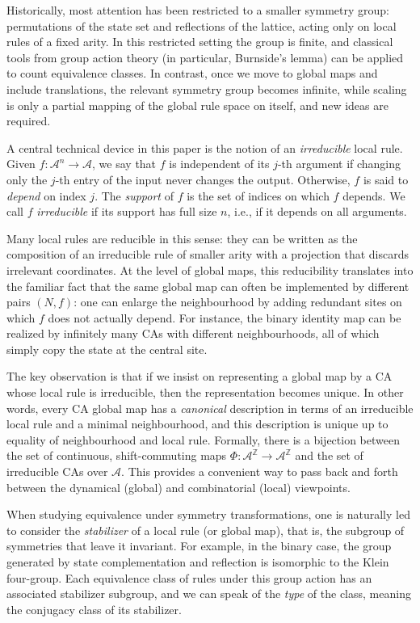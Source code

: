 \documentclass[a4paper]{article}
\begin{document}
Historically, most attention has been restricted to a smaller symmetry group:
permutations of the state set and reflections of the lattice, acting only on local
rules of a fixed arity. In this restricted setting the group is finite, and
classical tools from group action theory (in particular, Burnside's lemma) can
be applied to count equivalence classes. In contrast, once we move to global
maps and include translations, the relevant symmetry group becomes
infinite, while scaling is only a partial mapping of the global rule space on itself,
and new ideas are required.

A central technical device in this paper is the notion of an \emph{irreducible}
local rule. Given $f : \mathcal{A}^{n} \to \mathcal{A}$, we say that $f$ is independent of its
$j$-th argument if changing only the $j$-th entry of the input never changes
the output. Otherwise, $f$ is said to \emph{depend} on index $j$. The
\emph{support} of $f$ is the set of indices on which $f$ depends. We call $f$
\emph{irreducible} if its support has full size $n$, i.e., if it depends on
all arguments.

Many local rules are reducible in this sense: they can be written as the
composition of an irreducible rule of smaller arity with a projection that discards
irrelevant coordinates. At the level of global maps, this reducibility translates
into the familiar fact that the same global map can often be implemented by
different pairs $(N,f)$: one can enlarge the neighbourhood by adding
redundant sites on which $f$ does not actually depend. For instance, the binary
identity map can be realized by infinitely many CAs with different neighbourhoods,
all of which simply copy the state at the central site.

The key observation is that if we insist on representing a global map by a CA
whose local rule is irreducible, then the representation becomes unique. In other
words, every CA global map has a \emph{canonical} description in terms of an
irreducible local rule and a minimal neighbourhood, and this description is
unique up to equality of neighbourhood and local rule. Formally, there is a
bijection between the set of continuous, shift-commuting maps
$\Phi : \mathcal{A}^{\mathbb{Z}} \to \mathcal{A}^{\mathbb{Z}}$ and the set of irreducible CAs over
$\mathcal{A}$. This provides a convenient way to pass back and forth between the
dynamical (global) and combinatorial (local) viewpoints.

When studying equivalence under symmetry transformations, one is naturally
led to consider the \emph{stabilizer} of a local rule (or global map), that is, the
subgroup of symmetries that leave it invariant. For example, in the binary case,
the group generated by state complementation and reflection is isomorphic to the
Klein four-group. Each equivalence class of rules under this group action has an
associated stabilizer subgroup, and we can speak of the \emph{type} of the class,
meaning the conjugacy class of its stabilizer.
\end{document}
